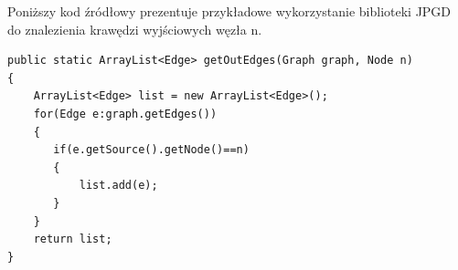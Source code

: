 Poniższy kod źródłowy prezentuje przykładowe wykorzystanie biblioteki JPGD do znalezienia krawędzi wyjściowych węzła n.
\newpage
\begin{verbatim}
public static ArrayList<Edge> getOutEdges(Graph graph, Node n)
{
    ArrayList<Edge> list = new ArrayList<Edge>();
    for(Edge e:graph.getEdges())
    {
       if(e.getSource().getNode()==n)
       {
           list.add(e);
       }
    }
    return list;
}
\end{verbatim}
